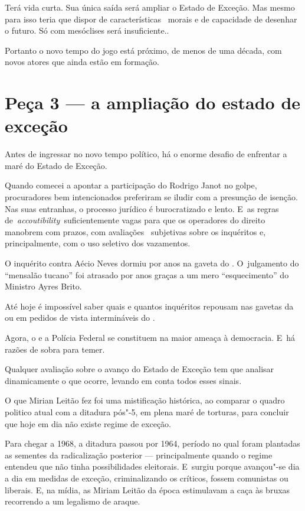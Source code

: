 Terá vida curta. Sua única saída será ampliar o Estado de Exceção. Mas
mesmo para isso teria que dispor de características~ morais e de
capacidade de desenhar o futuro. Só com mesóclises será insuficiente..

Portanto o novo tempo do jogo está próximo, de menos de uma década, com
novos atores que ainda estão em formação.

\section{Peça 3 --- a ampliação do estado de exceção}

Antes de ingressar no novo tempo político, há o enorme desafio de
enfrentar a maré do Estado de Exceção.

Quando comecei a apontar a participação do  Rodrigo Janot no golpe,
procuradores bem intencionados preferiram se iludir com a presunção de
isenção. Nas suas entranhas, o processo jurídico é burocratizado e
lento. E~as regras de~\emph{accoutibility~}suficientemente vagas para
que os operadores do direito manobrem com prazos, com avaliações~
subjetivas sobre os inquéritos e, principalmente, com o uso seletivo dos
vazamentos.

O inquérito contra Aécio Neves dormiu por anos na gaveta do . O~julgamento do ``mensalão tucano'' foi atrasado por anos graças a um mero
``esquecimento'' do Ministro Ayres Brito.

Até hoje é impossível saber quais e quantos inquéritos repousam nas
gavetas da  ou em pedidos de vista intermináveis do .

Agora, o  e a Polícia Federal se constituem na maior ameaça à
democracia. E~há razões de sobra para temer.

Qualquer avaliação sobre o avanço do Estado de Exceção tem que analisar
dinamicamente o que ocorre, levando em conta todos esses sinais.

O que Mirian Leitão fez foi uma mistificação histórica, ao comparar o
quadro politico atual com a ditadura pós"-5, em plena maré de torturas,
para concluir que hoje em dia não existe regime de exceção.~

Para chegar a 1968, a ditadura passou por 1964, período no qual foram
plantadas as sementes da radicalização posterior --- principalmente
quando o regime entendeu que não tinha possibilidades eleitorais. E~surgiu porque avançou"-se dia a dia em medidas de exceção, criminalizando
os críticos, fossem comunistas ou liberais. E, na mídia, as Miriam
Leitão da época estimulavam a caça às bruxas recorrendo a um legalismo
de araque.

